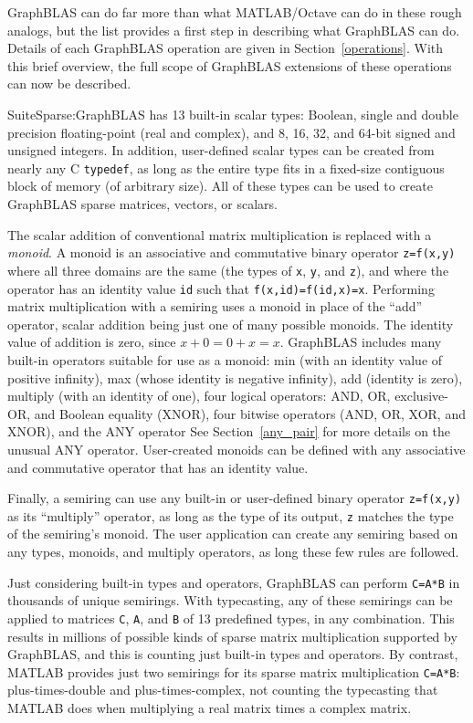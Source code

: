 \documentclass[12pt]{article}
\begin{document}
GraphBLAS can do far more than what MATLAB/Octave can do in these rough
analogs, but the list provides a first step in describing what GraphBLAS can
do.  Details of each GraphBLAS operation are given in Section~\ref{operations}.
With this brief overview, the full scope of GraphBLAS extensions of these
operations can now be described.

SuiteSparse:GraphBLAS has 13 built-in scalar types: Boolean, single and double
precision floating-point (real and complex), and 8, 16, 32, and 64-bit signed
and unsigned integers.  In addition, user-defined scalar types can be created
from nearly any C \verb'typedef', as long as the entire type fits in a
fixed-size contiguous block of memory (of arbitrary size).  All of these types
can be used to create GraphBLAS sparse matrices, vectors, or scalars.

The scalar addition of conventional matrix multiplication is replaced with a
{\em monoid}.  A monoid is an associative and commutative binary operator
\verb'z=f(x,y)' where all three domains are the same (the types of \verb'x',
\verb'y', and \verb'z'), and where the operator has an identity value \verb'id'
such that \verb'f(x,id)=f(id,x)=x'.  Performing matrix multiplication with a
semiring uses a monoid in place of the ``add'' operator, scalar addition being
just one of many possible monoids.  The identity value of addition is zero,
since $x+0=0+x=x$.   GraphBLAS includes many built-in operators suitable for
use as a monoid: min (with an identity value of positive infinity), max (whose
identity is negative infinity), add (identity is zero), multiply (with an
identity of one), four logical operators: AND, OR, exclusive-OR, and
Boolean equality (XNOR), four bitwise operators (AND, OR, XOR, and XNOR),
and the ANY operator
See Section~\ref{any_pair} for more details on the unusual ANY operator.
User-created monoids can be defined with any associative and
commutative operator that has an identity value.

Finally, a semiring can use any built-in or user-defined binary operator
\verb'z=f(x,y)' as its ``multiply'' operator, as long as the type of its
output, \verb'z' matches the type of the semiring's monoid.
The user application can create any semiring based on any types, monoids,
and multiply operators, as long these few rules are followed.

Just considering built-in types and operators, GraphBLAS can perform
\verb'C=A*B' in thousands of unique semirings.  With typecasting, any of these
semirings can be applied to matrices \verb'C', \verb'A', and \verb'B' of 13
predefined types, in any combination.  This results in millions of possible
kinds of sparse matrix multiplication supported by GraphBLAS, and this is
counting just built-in types and operators.  By contrast, MATLAB provides just
two semirings for its sparse matrix multiplication \verb'C=A*B':
plus-times-double and plus-times-complex, not counting the typecasting that
MATLAB does when multiplying a real matrix times a complex matrix.
\end{document}
